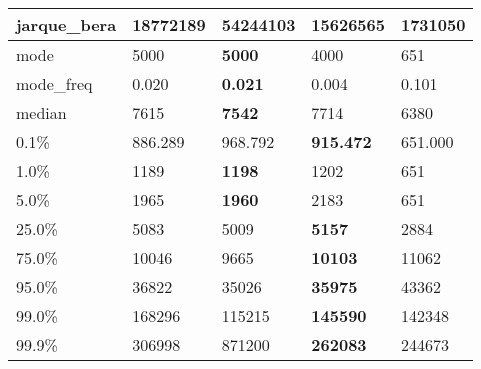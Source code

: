 \begin{table}[H]
\begin{tabular}{|l|m{10em}|m{10em}|m{10em}|m{10em}|}
\hline jarque\_bera & 18772189 & \cellcolor[rgb]{0.9, 0.54, 0.52} 54244103 & \bfseries 15626565 & 1731050 \\
\hline mode & 5000 & \bfseries 5000 & 4000 & \cellcolor[rgb]{0.9, 0.54, 0.52} 651 \\
\hline mode\_freq & 0.020 & \bfseries 0.021 & 0.004 & \cellcolor[rgb]{0.9, 0.54, 0.52} 0.101 \\
\hline median & 7615 & \bfseries 7542 & 7714 & \cellcolor[rgb]{0.9, 0.54, 0.52} 6380 \\
\hline 0.1\% & 886.289 & 968.792 & \bfseries 915.472 & \cellcolor[rgb]{0.9, 0.54, 0.52} 651.000 \\
\hline 1.0\% & 1189 & \bfseries 1198 & 1202 & \cellcolor[rgb]{0.9, 0.54, 0.52} 651 \\
\hline 5.0\% & 1965 & \bfseries 1960 & 2183 & \cellcolor[rgb]{0.9, 0.54, 0.52} 651 \\
\hline 25.0\% & 5083 & 5009 & \bfseries 5157 & \cellcolor[rgb]{0.9, 0.54, 0.52} 2884 \\
\hline 75.0\% & 10046 & 9665 & \bfseries 10103 & \cellcolor[rgb]{0.9, 0.54, 0.52} 11062 \\
\hline 95.0\% & 36822 & 35026 & \bfseries 35975 & \cellcolor[rgb]{0.9, 0.54, 0.52} 43362 \\
\hline 99.0\% & 168296 & \cellcolor[rgb]{0.9, 0.54, 0.52} 115215 & \bfseries 145590 & 142348 \\
\hline 99.9\% & 306998 & \cellcolor[rgb]{0.9, 0.54, 0.52} 871200 & \bfseries 262083 & 244673 \\
\hline
\end{tabular}
\end{table}
